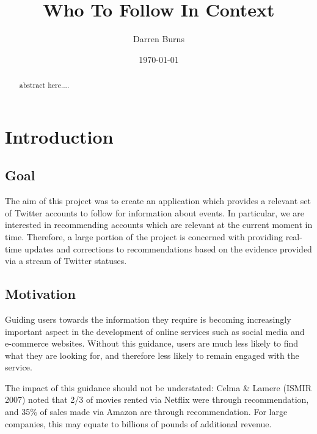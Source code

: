 \documentclass{l4proj}
\begin{document}
\title{Who To Follow In Context}
\author{Darren Burns}
\date{\today}
\maketitle

\begin{abstract}

abstract here....

\end{abstract}

\educationalconsent
%
%
\tableofcontents

\chapter{Introduction}


\section{Goal}
The aim of this project was to create an application which provides a relevant set of Twitter accounts to follow for information about events. In particular, we are interested in recommending accounts which are relevant at the current moment in time. Therefore, a large portion of the project is concerned with providing real-time updates and corrections to recommendations based on the evidence provided via a stream of Twitter statuses.


\section{Motivation}
Guiding users towards the information they require is becoming increasingly important aspect in the development of online services such as social media and e-commerce websites. Without this guidance, users are much less likely to find what they are looking for, and therefore less likely to remain engaged with the service.

The impact of this guidance should not be understated: Celma \& Lamere (ISMIR 2007) noted that 2/3 of movies rented via Netflix were through recommendation, and 35\% of sales made via Amazon are through recommendation. For large companies, this may equate to billions of pounds of additional revenue.
\end{document}

